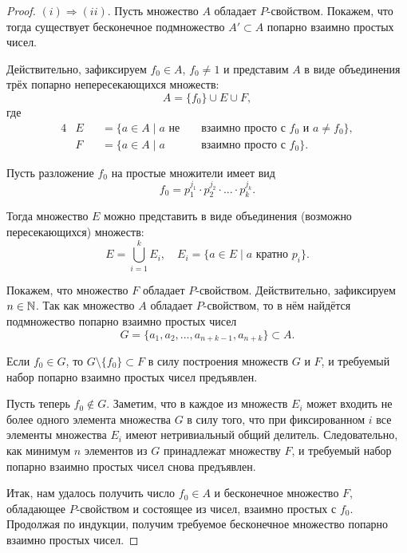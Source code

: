 \begin{proof}
	$(i) \Rightarrow (ii)$.
	Пусть множество $A$ обладает $P$-свойством.
	Покажем, что
	тогда существует бесконечное подмножество $A'\subset A$ попарно взаимно простых чисел.
	
	Действительно,
	зафиксируем $f_0\in A$, $f_0 \neq 1$ и представим $A$ в виде объединения трёх попарно непересекающихся множеств:
	\begin{equation}
		A = \{f_0\} \cup E \cup F
		,
	\end{equation}
	где
	\begin{alignat*}{4}
		& E &&= \{ a \in A \mid a \mbox{~не~}&&\mbox{взаимно просто с~} f_0 \mbox{~и~} a\neq f_0\}
		,
		\\
		& F &&= \{ a \in A \mid a            &&\mbox{взаимно просто с~} f_0 \}
		.
	\end{alignat*}

	Пусть разложение $f_0$ на простые множители имеет вид
	\begin{equation}
		f_0 = p_1^{j_1} \cdot p_2^{j_2} \cdot ... \cdot p_k^{j_k}
		.
	\end{equation}

	Тогда множество $E$ можно представить в виде объединения (возможно пересекающихся) множеств:
	\begin{equation}
		E = \bigcup_{i=1}^{k} E_i,\quad E_i = \{a\in E \mid a \mbox{~кратно~} p_i\}
		.
	\end{equation}

	Покажем, что множество $F$ обладает $P$-свойством.
	Действительно, зафиксируем $n\in\mathbb{N}$.
	Так как множество $A$ обладает $P$-свойством,
	то в нём найдётся подмножество попарно взаимно простых чисел
	$$G=\{a_1, a_2, ..., a_{n+k-1}, a_{n+k}\}\subset A.$$

	Если $f_0\in G$, то $G\setminus \{f_0\} \subset F$ в силу построения множеств $G$ и $F$, и требуемый набор попарно взаимно простых чисел предъявлен.

	Пусть теперь $f_0\notin G$.
	Заметим, что в каждое из множеств $E_i$ может входить не более одного элемента множества $G$
	в силу того, что при фиксированном $i$ все элементы множества $E_i$ имеют нетривиальный общий делитель.
	Следовательно, как минимум $n$ элементов из $G$ принадлежат множеству $F$,
	и требуемый набор попарно взаимно простых чисел снова предъявлен.


	Итак, нам удалось получить число $f_0\in A$ и бесконечное множество $F$, обладающее $P$-свойством
	и состоящее из чисел, взаимно простых с $f_0$.
	Продолжая по индукции, получим требуемое бесконечное множество попарно взаимно простых чисел.
	

\end{proof}
